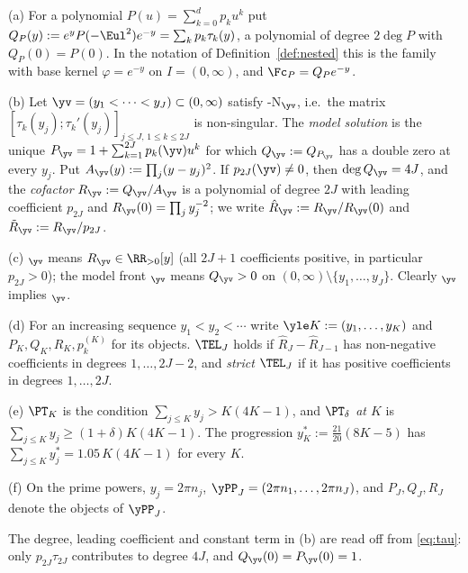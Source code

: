 \begin{definition}\label{def:toy}
\textup{(a)} For a polynomial $P(u)=\sum_{k=0}^d p_ku^k$ put
$Q_P(y):=e^{y}P(-\Eul^2)e^{-y}=\sum_k p_k\tau_k(y)$, a polynomial of degree $2\deg P$ with $Q_P(0)=P(0)$. In the
notation of Definition~\ref{def:nested} this is the family with base kernel $\varphi=e^{-y}$ on $I=(0,\infty)$, and
$\Fc_P=Q_Pe^{-y}$.

\textup{(b)} Let $\yv=(y_1<\dots<y_J)\subset(0,\infty)$ satisfy \hyp{N}$_{\yv}$, i.e.\ the matrix
$[\tau_k(y_j);\tau_k'(y_j)]_{j\le J,\,1\le k\le 2J}$ is non-singular. The \emph{model solution} is the unique
$P_{\yv}=1+\sum_{k=1}^{2J}p_k(\yv)u^k$ for which $Q_{\yv}:=Q_{P_{\yv}}$ has a double zero at every $y_j$. Put
$A_{\yv}(y):=\prod_j(y-y_j)^2$. If $p_{2J}(\yv)\neq0$, then $\deg Q_{\yv}=4J$, and the \emph{cofactor}
$R_{\yv}:=Q_{\yv}/A_{\yv}$ is a polynomial of degree $2J$ with leading coefficient $p_{2J}$ and
$R_{\yv}(0)=\prod_jy_j^{-2}$; we write $\hat R_{\yv}:=R_{\yv}/R_{\yv}(0)$ and $\tilde R_{\yv}:=R_{\yv}/p_{2J}$.

\textup{(c)} \Rp$_{\yv}$ means $R_{\yv}\in\RR_{>0}[y]$ (all $2J+1$ coefficients positive, in particular
$p_{2J}>0$); the model front \FRt$_{\yv}$ means $Q_{\yv}>0$ on $(0,\infty)\setminus\{y_1,\dots,y_J\}$. Clearly
\Rp$_{\yv}$ implies \FRt$_{\yv}$.

\textup{(d)} For an increasing sequence $y_1<y_2<\cdots$ write $\yle K:=(y_1,\dots,y_K)$ and $P_K,Q_K,R_K,p^{(K)}_k$
for its objects. \emph{$\TEL_J$} holds if $\hat R_J-\hat R_{J-1}$ has non-negative coefficients in degrees
$1,\dots,2J-2$, and \emph{strict $\TEL_J$} if it has positive coefficients in degrees $1,\dots,2J$.

\textup{(e)} \emph{$\PT_K$} is the condition $\sum_{j\le K}y_j>K(4K-1)$, and \emph{$\PT_\delta$ at $K$} is
$\sum_{j\le K}y_j\ge(1+\delta)K(4K-1)$. The progression $y^*_K:=\frac{21}{20}(8K-5)$ has
$\sum_{j\le K}y^*_j=1.05\,K(4K-1)$ for every $K$.

\textup{(f)} On the prime powers, $y_j=2\pi n_j$, $\yPP_J=(2\pi n_1,\dots,2\pi n_J)$, and $P_J,Q_J,R_J$ denote the
objects of $\yPP_J$.
\end{definition}

The degree, leading coefficient and constant term in (b) are read off from \eqref{eq:tau}: only $p_{2J}\tau_{2J}$
contributes to degree $4J$, and $Q_{\yv}(0)=P_{\yv}(0)=1$.

